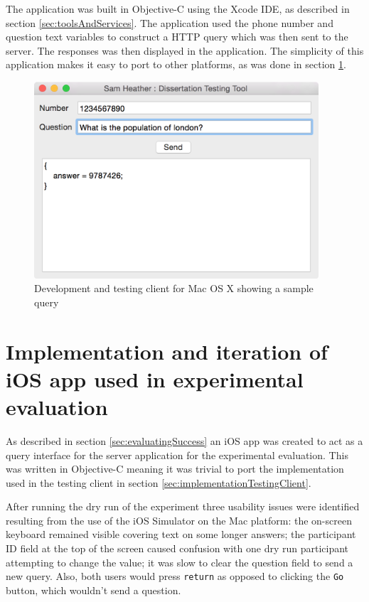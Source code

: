 \documentclass[authoryearcitations]{UoYCSproject}
\begin{document}
The application was built in Objective-C using the Xcode IDE, as described in section \ref{sec:toolsAndServices}. The application used the phone number and question text variables to construct a HTTP query which was then sent to the server. The responses was then displayed in the application. The simplicity of this application makes it easy to port to other platforms, as was done in section \ref{sec:implementationExperimentClient}.

\begin{figure}[htb]
    \centering
    \includegraphics[width=300pt]{devClient}
    \caption{Development and testing client for Mac OS X showing a sample query}
    \label{fig:devClient}
\end{figure}

\section{Implementation and iteration of iOS app used in experimental evaluation}
\label{sec:implementationExperimentClient}
As described in section \ref{sec:evaluatingSuccess} an iOS app was created to act as a query interface for the server application for the experimental evaluation. This was written in Objective-C meaning it was trivial to port the implementation used in the testing client in section \ref{sec:implementationTestingClient}.

After running the dry run of the experiment three usability issues were identified resulting from the use of the iOS Simulator on the Mac platform: the on-screen keyboard remained visible covering text on some longer answers; the participant ID field at the top of the screen caused confusion with one dry run participant attempting to change the value; it was slow to clear the question field to send a new query. Also, both users would press \texttt{return} as opposed to clicking the \texttt{Go} button, which wouldn't send a question.
\end{document}
